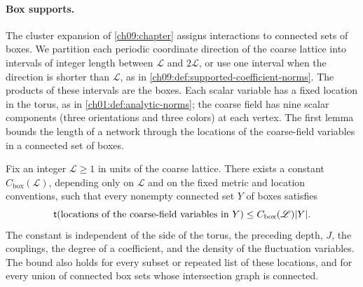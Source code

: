 \paragraph{Box supports.}
The cluster expansion of \cref{ch09:chapter} assigns interactions to connected sets of boxes. We partition each periodic coordinate direction of the coarse lattice into intervals of integer length between $\mathscr L$ and $2\mathscr L$, or use one interval when the direction is shorter than $\mathscr L$, as in \cref{ch09:def:supported-coefficient-norms}. The products of these intervals are the boxes. Each scalar variable has a fixed location in the torus, as in \cref{ch01:def:analytic-norms}; the coarse field has nine scalar components (three orientations and three colors) at each vertex. The first lemma bounds the length of a network through the locations of the coarse-field variables in a connected set of boxes.

\begin{lemma}\label{ch12:lem:target-support-geometry}
Fix an integer $\mathscr L\ge1$ in units of the coarse lattice. There exists a constant $C_{\mathrm{box}}(\mathscr L)$, depending only on $\mathscr L$ and on the fixed metric and location conventions, such that every nonempty connected set $Y$ of boxes satisfies
\begin{equation}\label{ch12:eq:target-support-geometry}
 \mathsf t(\text{locations of the coarse-field variables in }Y)\le C_{\mathrm{box}}(\mathscr L)\lvert Y\rvert .
\end{equation}
The constant is independent of the side of the torus, the preceding depth, $J$, the couplings, the degree of a coefficient, and the density of the fluctuation variables. The bound also holds for every subset or repeated list of these locations, and for every union of connected box sets whose intersection graph is connected.
\end{lemma}

